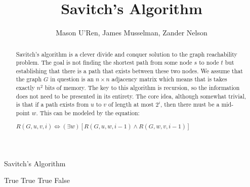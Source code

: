 \documentclass[]{article}
\title{Savitch's Algorithm}
\author{Mason U'Ren, James Musselman, Zander Nelson}
\let\oldReturn\Return
\renewcommand{\Return}{\State\oldReturn}
\begin{document}
\maketitle

\begin{abstract}
Savitch's algorithm is a clever divide and conquer solution to the graph reachability problem. The goal is not finding the shortest path from some node $s$ to node $t$ but establishing that there is a path that exists between these two nodes. We assume that the graph $G$ in question is an $n\times n$ adjacency matrix which means that is takes exactly $n^2$ bits of memory. The key to this algorithm is recursion, so the information does not need to be presented in its entirety. The core idea, although somewhat trivial, is that if a path exists from $u$ to $v$ of length at most $2^i$, then there must be a mid-point $w$. This can be modeled by the equation:
\begin{center}
	$R(G,u,v,i) \iff (\exists w)[R(G,u,w,i - 1) \wedge R(G,w,v,i - 1)]$
\end{center}
\end{abstract}

\begin{algorithm}
	\caption{Savitch's Algorithm}
	\begin{algorithmic}[1]
				\Return True
				\Return True
			\EndIf
		\Else
					\Return True
				\EndIf
			\EndFor
		\EndIf
		\Return False
	\end{algorithmic}
\end{algorithm}

\section{}
\end{document}
